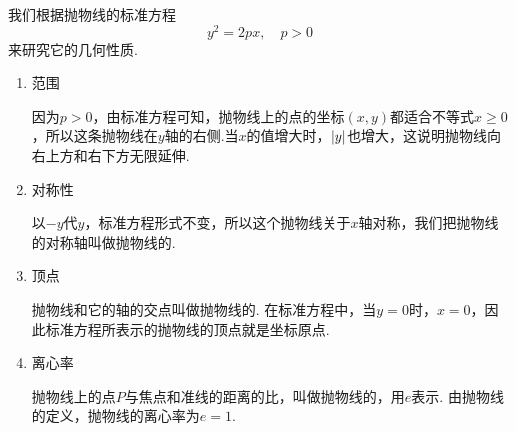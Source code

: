 我们根据抛物线的标准方程\[
y^2 = 2px, \quad p > 0
\]来研究它的几何性质.
\begin{enumerate}
\item 范围

因为\(p>0\)，由标准方程可知，抛物线上的点的坐标\((x,y)\)都适合不等式\(x \geq 0\)，所以这条抛物线在\(y\)轴的右侧.当\(x\)的值增大时，\(\abs{y}\)也增大，这说明抛物线向右上方和右下方无限延伸.

\item 对称性

以\(-y\)代\(y\)，标准方程形式不变，所以这个抛物线关于\(x\)轴对称，我们把抛物线的对称轴叫做抛物线的.

\item 顶点

抛物线和它的轴的交点叫做抛物线的.
在标准方程中，当\(y=0\)时，\(x=0\)，因此标准方程所表示的抛物线的顶点就是坐标原点.

\item 离心率

抛物线上的点\(P\)与焦点和准线的距离的比，叫做抛物线的，用\(e\)表示.
由抛物线的定义，抛物线的离心率为\(e = 1\).
\end{enumerate}

